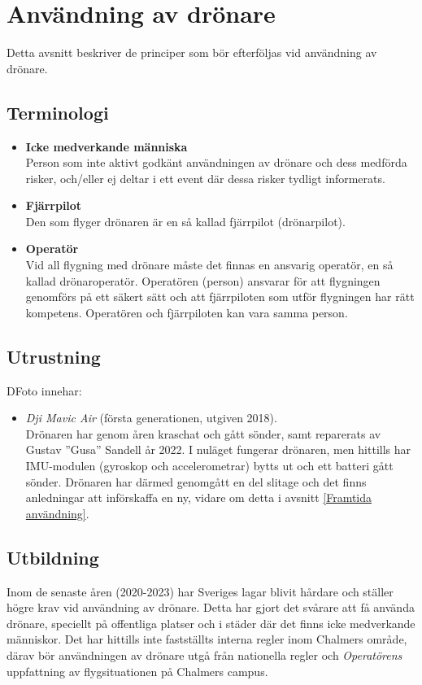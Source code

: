 \section{Användning av drönare}
\label{Användning_av_drönare}
Detta avsnitt beskriver de principer som bör efterföljas vid användning av drönare.

\subsection{Terminologi}
\begin{itemize}
    \item \textbf{Icke medverkande människa} \\
    Person som inte aktivt godkänt användningen av drönare och dess medförda risker, och/eller ej deltar i ett event där dessa risker tydligt informerats. 
    \item \textbf{Fjärrpilot} \\
    Den som flyger drönaren är en så kallad fjärrpilot (drönarpilot).    
    \item \textbf{Operatör} \\
    Vid all flygning med drönare måste det finnas en ansvarig operatör, en så kallad drönaroperatör. Operatören (person) ansvarar för att flygningen genomförs på ett säkert sätt och att fjärrpiloten som utför flygningen har rätt kompetens. Operatören och fjärrpiloten kan vara samma person. 
    
\end{itemize}

\subsection{Utrustning}
DFoto innehar:
\begin{itemize}
    \item \textit{Dji Mavic Air} (första generationen, utgiven 2018). \\
    Drönaren har genom åren kraschat och gått sönder, samt reparerats av Gustav ''Gusa'' Sandell år 2022. I nuläget fungerar drönaren, men hittills har IMU-modulen (gyroskop och accelerometrar) bytts ut och ett batteri gått sönder. Drönaren har därmed genomgått en del slitage och det finns anledningar att införskaffa en ny, vidare om detta i avsnitt \ref{Framtida användning}. 
    
\end{itemize}


\subsection{Utbildning}
Inom de senaste åren (2020-2023) har Sveriges lagar blivit hårdare och ställer högre krav vid användning av drönare. Detta har gjort det svårare att få använda drönare, speciellt på offentliga platser och i städer där det finns icke medverkande människor. Det har hittills inte fastställts interna regler inom Chalmers område, därav bör användningen av drönare utgå från nationella regler och \textit{Operatörens} uppfattning av flygsituationen på Chalmers campus. 

